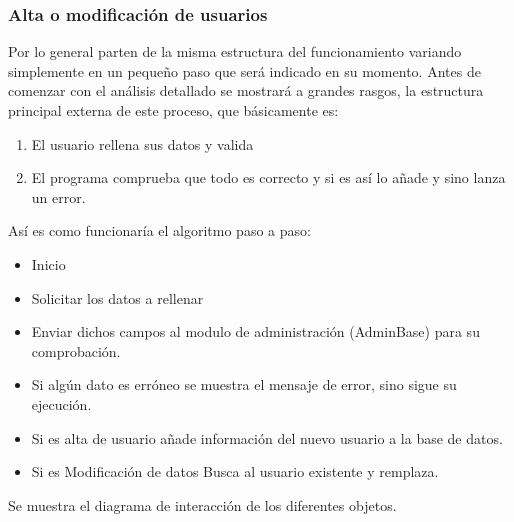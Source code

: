 \subsubsection{Alta o modificación de usuarios}
Por lo general parten de la misma estructura del funcionamiento variando simplemente en un pequeño paso que será indicado en su momento. Antes de comenzar con el análisis detallado se mostrará a grandes rasgos, la estructura principal externa de este proceso, que básicamente es:
\begin{enumerate}
\item El usuario rellena sus datos y valida
\item El programa comprueba que todo es correcto y si es así lo añade y sino lanza un error.
\end{enumerate}
Así es como funcionaría el algoritmo paso a paso:
\begin{itemize}
\item Inicio
\item Solicitar los datos a rellenar
\item Enviar dichos campos al modulo de administración (AdminBase) para su comprobación.
\item Si algún dato es erróneo se muestra el mensaje de error, sino sigue su ejecución.
\item Si es alta de usuario añade información del nuevo usuario a la base de datos.
\item Si es Modificación de datos Busca al usuario existente y remplaza.
\end{itemize}
Se muestra el diagrama de interacción de los diferentes objetos.
